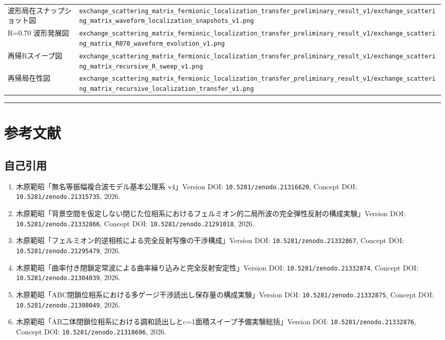\documentclass[
  xelatex,
  ja=standard]{bxjsarticle}
\providecommand{\tightlist}{%
  \setlength{\itemsep}{0pt}\setlength{\parskip}{0pt}}
\begin{document}
{\begin{longtable}[]{@{}
  >{\raggedright\arraybackslash}p{}
  >{\raggedright\arraybackslash}p{}@{}}
波形局在スナップショット図 &
\texttt{exchange\_scattering\_matrix\_fermionic\_localization\_transfer\_preliminary\_result\_v1/exchange\_scattering\_matrix\_waveform\_localization\_snapshots\_v1.png} \\
R=0.70 波形発展図 &
\texttt{exchange\_scattering\_matrix\_fermionic\_localization\_transfer\_preliminary\_result\_v1/exchange\_scattering\_matrix\_R070\_waveform\_evolution\_v1.png} \\
再帰Rスイープ図 &
\texttt{exchange\_scattering\_matrix\_fermionic\_localization\_transfer\_preliminary\_result\_v1/exchange\_scattering\_matrix\_recursive\_R\_sweep\_v1.png} \\
再帰局在性図 &
\texttt{exchange\_scattering\_matrix\_fermionic\_localization\_transfer\_preliminary\_result\_v1/exchange\_scattering\_matrix\_recursive\_localization\_transfer\_v1.png} \\
\end{longtable}
}

\begin{center}\rule{0.5\linewidth}{0.5pt}\end{center}

\section{参考文献}\label{ux53c2ux8003ux6587ux732e}

\subsection{自己引用}\label{ux81eaux5df1ux5f15ux7528}

\begin{enumerate}
\def\labelenumi{\arabic{enumi}.}
\tightlist
\item
  木原範昭「無名等振幅複合波モデル基本公理系 v4」Version DOI:
  \texttt{10.5281/zenodo.21316620}, Concept DOI:
  \texttt{10.5281/zenodo.21315735}, 2026.
\item
  木原範昭「背景空間を仮定しない閉じた位相系におけるフェルミオン的二局所波の完全弾性反射の構成実験」Version
  DOI: \texttt{10.5281/zenodo.21332866}, Concept DOI:
  \texttt{10.5281/zenodo.21291018}, 2026.
\item
  木原範昭「フェルミオン的逆相核による完全反射写像の干渉構成」Version
  DOI: \texttt{10.5281/zenodo.21332867}, Concept DOI:
  \texttt{10.5281/zenodo.21295479}, 2026.
\item
  木原範昭「曲率付き閉鎖定常波による曲率繰り込みと完全反射安定性」Version
  DOI: \texttt{10.5281/zenodo.21332874}, Concept DOI:
  \texttt{10.5281/zenodo.21304039}, 2026.
\item
  木原範昭「ABC閉鎖位相系における多ゲージ干渉読出し保存量の構成実験」Version
  DOI: \texttt{10.5281/zenodo.21332875}, Concept DOI:
  \texttt{10.5281/zenodo.21308049}, 2026.
\item
  木原範昭「AB二体閉鎖位相系における調和読出しとc=1面積スイープ予備実験総括」Version
  DOI: \texttt{10.5281/zenodo.21332876}, Concept DOI:
  \texttt{10.5281/zenodo.21318696}, 2026.
\end{enumerate}
\end{document}
